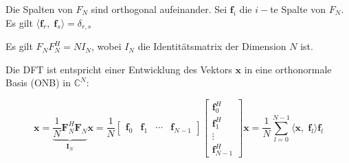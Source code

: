 \documentclass[11pt]{article}
\begin{document}

Die Spalten von $F_N$ sind orthogonal aufeinander. Sei $\mathbf{f}_i$ die $i-$te Spalte von $F_N$. Es gilt $\langle \mathbf{f}_r, \; \mathbf{f}_s \rangle = \delta_{r,s}$

Es gilt $F_N F_N^H = N I_N$, wobei $I_N$ die Identitätsmatrix der Dimension $N$ ist.

Die DFT ist entspricht einer Entwicklung des Vektors $\mathbf{x}$ in eine orthonormale Basis (ONB) in $\mathbb{C}^N$:

$$\mathbf{x} = \underbrace{\frac{1}{N} \mathbf{F}_N^H \mathbf{F}_N}_{\mathbf{I}_N} \mathbf{x} = \frac{1}{N} \begin{bmatrix}
    \mathbf{f}_0 & \mathbf{f}_1 & \cdots & \mathbf{f}_{N-1}
\end{bmatrix} \begin{bmatrix}
    \mathbf{f}_0^H \\
    \mathbf{f}_1^H \\
    \vdots \\
    \mathbf{f}_{N-1}^H
\end{bmatrix} \mathbf{x} = \frac{1}{N} \sum_{l=0}^{N-1} \langle \mathbf{x}, \; \mathbf{f}_l \rangle \mathbf{f}_l$$
\end{document}
